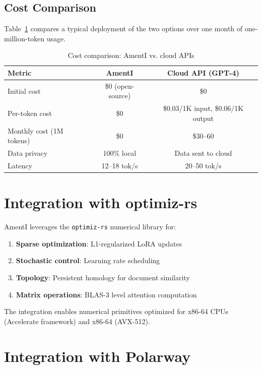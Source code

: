 \documentclass[11pt,a4paper]{article}
\theoremstyle{plain}
\theoremstyle{definition}
\begin{document}
\subsection{Cost Comparison}

Table~\ref{tab:cost} compares a typical deployment of the two options over
one month of one-million-token usage.

\begin{table}[h]
\centering
\caption{Cost comparison: AmentI vs. cloud APIs}
\begin{tabular}{lcc}
\toprule
\textbf{Metric} & \textbf{AmentI} & \textbf{Cloud API (GPT-4)} \\
\midrule
Initial cost & \$0 (open-source) & \$0 \\
Per-token cost & \$0 & \$0.03/1K input, \$0.06/1K output \\
Monthly cost (1M tokens) & \$0 & \$30--60 \\
Data privacy & 100\% local & Data sent to cloud \\
Latency & 12--18 tok/s & 20--50 tok/s \\
\bottomrule
\end{tabular}
\label{tab:cost}
\end{table}

\section{Integration with optimiz-rs}
\label{sec:optimizrs}

AmentI leverages the \texttt{optimiz-rs} numerical library for:

\begin{enumerate}
    \item \textbf{Sparse optimization}: L1-regularized LoRA updates
    \item \textbf{Stochastic control}: Learning rate scheduling
    \item \textbf{Topology}: Persistent homology for document similarity
    \item \textbf{Matrix operations}: BLAS-3 level attention computation
\end{enumerate}

The integration enables numerical primitives optimized for x86-64 CPUs
(Accelerate framework) and x86-64 (AVX-512).

\section{Integration with Polarway}
\label{sec:polarway}
\end{document}
